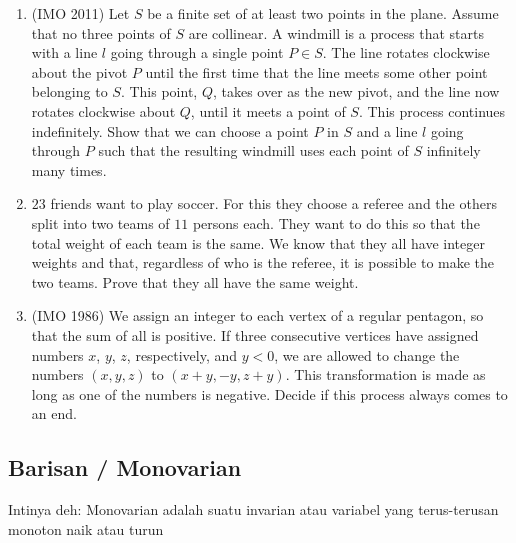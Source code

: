 \documentclass[11pt]{scrartcl}
\begin{document}
\begin{enumerate}
    \item (IMO 2011) Let $S$ be a finite set of at least two points in the plane. Assume that no three points of $S$ are collinear. A windmill is a process that starts with a line $l$ going through a single point $P \in S$. The line rotates clockwise about the pivot $P$ until the first time that the line meets some other point belonging to $S$. This point, $Q$, takes over as the new pivot, and the line now rotates clockwise about $Q$, until it meets a point of $S$. This process continues indefinitely. Show that we can choose a point $P$ in $S$ and a line $l$ going through $P$ such that the resulting windmill uses each point of $S$ infinitely many times.

    \item $23$ friends want to play soccer. For this they choose a referee and the others split into two teams of $11$ persons each. They want to do this so that the total weight of each team is the same. We know that they all have integer weights and that, regardless of who is the referee, it is possible to make the two teams. Prove that they all have the same weight.

    \item (IMO 1986) We assign an integer to each vertex of a regular pentagon, so that the sum of all is positive. If three consecutive vertices have assigned numbers $x$, $y$, $z$, respectively, and $y < 0$, we are allowed to change the numbers $(x,y,z)$ to $(x + y,-y,z + y)$. This transformation is made as long as one of the numbers is negative. Decide if this process always comes to an end.
\end{enumerate}

\subsection{Barisan / Monovarian}
\begin{definition}
    Intinya deh: Monovarian adalah suatu invarian atau variabel yang terus-terusan monoton naik atau turun
\end{definition}
\end{document}
